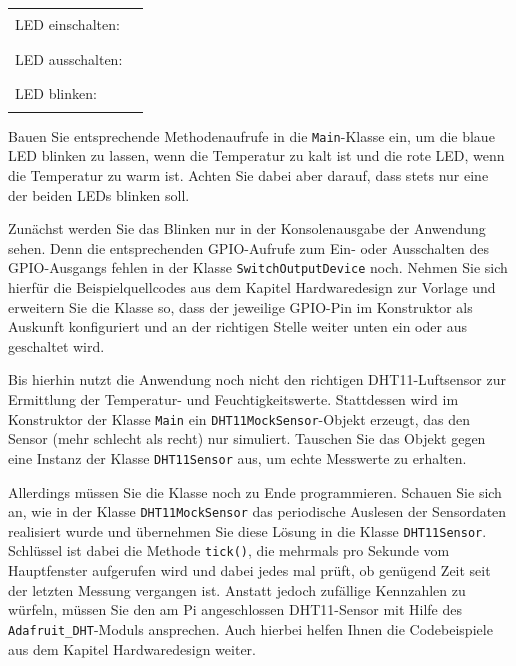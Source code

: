 {
    \renewcommand{\arraystretch}{2.5}
    \medskip

    \begin{tabular}{p{}p{}}
        LED einschalten: & \rule{20em}{1pt} \\
        LED ausschalten: & \rule{20em}{1pt} \\
        LED blinken:     & \rule{20em}{1pt} \\
    \end{tabular}

    \medskip
}

Bauen Sie entsprechende Methodenaufrufe in die \texttt{Main}-Klasse ein, um
die blaue LED blinken zu lassen, wenn die Temperatur zu kalt ist und die rote
LED, wenn die Temperatur zu warm ist. Achten Sie dabei aber darauf, dass stets
nur eine der beiden LEDs blinken soll.

Zunächst werden Sie das Blinken nur in der Konsolenausgabe der Anwendung sehen.
Denn die entsprechenden GPIO-Aufrufe zum Ein- oder Ausschalten des GPIO-Ausgangs
fehlen in der Klasse \texttt{Switch\-Output\-Device} noch. Nehmen Sie sich
hierfür die Beispielquellcodes aus dem Kapitel \glqq{}Hardwaredesign\grqq{}
zur Vorlage und erweitern Sie die Klasse so, dass der jeweilige GPIO-Pin im
Konstruktor als Auskunft konfiguriert und an der richtigen Stelle weiter unten
ein oder aus geschaltet wird.

\bigskip
\teilaufgabe
Bis hierhin nutzt die Anwendung noch nicht den richtigen DHT11-Luftsensor zur
Ermittlung der Temperatur- und Feuchtigkeitswerte. Stattdessen wird im Konstruktor
der Klasse \texttt{Main} ein \texttt{DHT11\-Mock\-Sensor}-Objekt erzeugt, das den
Sensor (mehr schlecht als recht) nur simuliert. Tauschen Sie das Objekt gegen eine
Instanz der Klasse \texttt{DHT11\-Sensor} aus, um echte Messwerte zu erhalten.

Allerdings müssen Sie die Klasse noch zu Ende programmieren. Schauen Sie sich an,
wie in der Klasse \texttt{DHT11\-Mock\-Sensor} das periodische \glqq{}Auslesen\grqq{}
der Sensordaten realisiert wurde und übernehmen Sie diese Lösung in die Klasse
\texttt{DHT11\-Sensor}. Schlüssel ist dabei die Methode \texttt{tick()}, die
mehrmals pro Sekunde vom Hauptfenster aufgerufen wird und dabei jedes mal prüft,
ob genügend Zeit seit der letzten Messung vergangen ist. Anstatt jedoch zufällige
Kennzahlen zu würfeln, müssen Sie den am Pi angeschlossen DHT11-Sensor mit Hilfe
des \texttt{Adafruit\_\-DHT}-Moduls ansprechen. Auch hierbei helfen Ihnen die
Codebeispiele aus dem Kapitel \glqq{}Hardwaredesign\grqq{} weiter.

